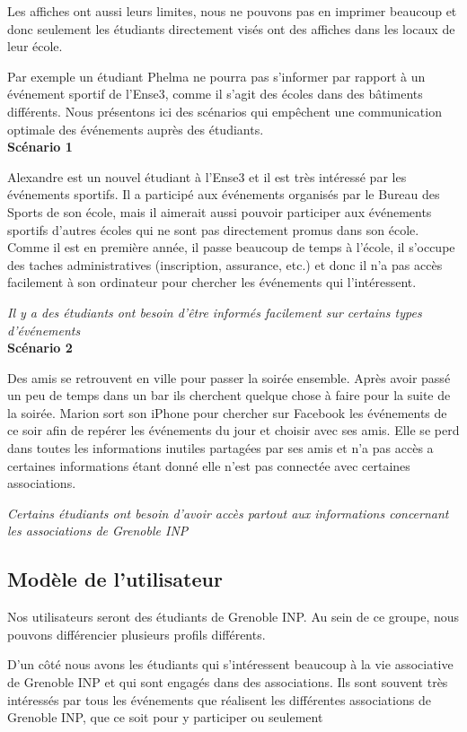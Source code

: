 \documentclass[a4paper, 11px]{article}
\begin{document}
Les affiches ont aussi leurs limites, nous ne pouvons pas en imprimer beaucoup et donc seulement les étudiants directement visés ont des affiches dans les locaux de leur école.

Par exemple un étudiant Phelma ne pourra pas s'informer par rapport à un événement sportif de l'Ense3, comme il s'agit des écoles dans des bâtiments différents.
Nous présentons ici des scénarios qui empêchent une communication optimale des événements auprès des étudiants.\\

{\bf Scénario 1}

Alexandre est un nouvel étudiant à l'Ense3 et il est très intéressé par les événements sportifs. Il a participé aux événements organisés par le Bureau des Sports de son école, mais il aimerait aussi pouvoir participer aux événements sportifs d'autres écoles qui ne sont pas directement promus dans son école. Comme il est en première année, il passe beaucoup de temps à l'école, il s'occupe des taches administratives (inscription, assurance, etc.) et donc il n'a pas accès facilement à son ordinateur pour chercher les événements qui l'intéressent.

\textit{Il y a des étudiants ont besoin d'être informés facilement sur certains types d'événements}\\

{\bf Scénario 2}

Des amis se retrouvent en ville pour passer la soirée ensemble. Après avoir passé un peu de temps dans un bar ils cherchent quelque chose à faire pour la suite de la soirée. Marion sort son iPhone pour chercher sur Facebook les événements de ce soir afin de repérer les événements du jour et choisir avec ses amis. Elle se perd dans toutes les informations inutiles partagées par ses amis et n'a pas accès a certaines informations étant donné elle n'est pas connectée avec certaines associations.

\textit{Certains étudiants ont besoin d'avoir accès partout aux informations concernant les associations de Grenoble INP}

\subsection{Modèle de l'utilisateur}

Nos utilisateurs seront des étudiants de Grenoble INP. Au sein de ce groupe, nous pouvons différencier plusieurs profils différents.

D'un côté nous avons les étudiants qui s'intéressent beaucoup à la vie associative de Grenoble INP et qui sont engagés dans des associations. Ils sont souvent très intéressés par tous les événements que réalisent les différentes associations de Grenoble INP, que ce soit pour y participer ou seulement
\end{document}
